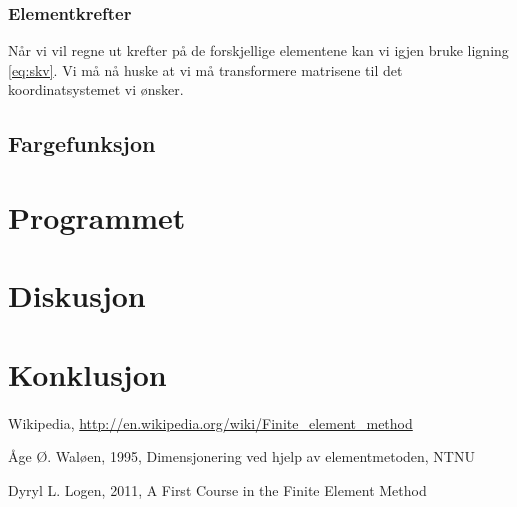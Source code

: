 \documentclass[10pt,a4paper, norsk]{article}
\begin{document}
\subsubsection*{Elementkrefter}
Når vi vil regne ut krefter på de forskjellige elementene kan vi igjen bruke ligning \ref{eq:skv}. Vi må nå huske at vi må transformere matrisene til det koordinatsystemet vi ønsker. 


\subsection*{Fargefunksjon}




\section*{Programmet} 


\section*{Diskusjon}


\section*{Konklusjon}

\paragraph{} 


\begin{thebibliography}{9}

  Wikipedia,
  \url{http://en.wikipedia.org/wiki/Finite_element_method}
  

  Åge Ø. Waløen,
  1995, 
  Dimensjonering ved hjelp av elementmetoden, NTNU
 
	Dyryl L. Logen, 2011, A First Course in the Finite Element Method


\end{thebibliography}
\end{document}
